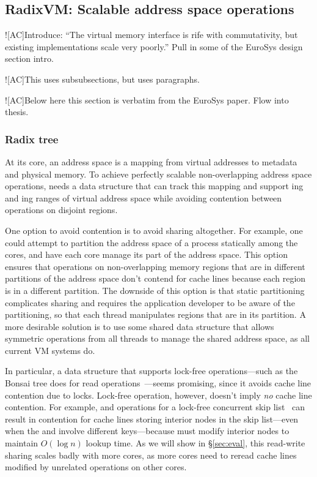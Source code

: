 \subsection{RadixVM: Scalable address space operations}

\XXX![AC]{Introduce: ``The virtual memory interface is rife with
  commutativity, but existing implementations scale very poorly.''
  Pull in some of the EuroSys design section intro.}

\XXX![AC]{This uses subsubsections, but  uses paragraphs.}

\XXX![AC]{Below here this section is verbatim from the EuroSys paper.
  Flow into thesis.}

\subsubsection{Radix tree}
\label{sec:radixvm:tree}

At its core, an address space is a mapping from virtual addresses to
metadata and physical memory.  To achieve perfectly scalable
non-overlapping address space operations, \vm needs a data structure
that can track this mapping and support ing and
ing ranges of virtual address space while avoiding
contention between operations on disjoint regions.

One option to avoid contention is to avoid sharing altogether. For
example, one could attempt to partition the address space of a process
statically
among the cores, and have each core manage its part of the address space.
This option ensures that operations on non-overlapping memory regions
that are in different partitions of the address space don't contend
for cache lines because each region is in a different partition. The
downside of this option is that static partitioning complicates
sharing and requires the application developer to
be aware of the partitioning, so that each thread manipulates
regions that are in its partition.  A more desirable solution is
to use some shared data structure that allows symmetric operations
from all threads to manage the shared address space,
as all current VM systems do.

In particular, a data structure that supports lock-free operations---such
as the Bonsai tree does for read
operations~\cite{clements:bonsai}---seems promising, since it avoids
cache line contention due to locks.  Lock-free operation,
however, doesn't imply \emph{no} cache line contention.  For example,
 and  operations for a lock-free concurrent skip
list~\cite{herlihy:art} can result in contention for cache lines
storing interior nodes in the skip list---even when the 
and  involve different keys---because  must
modify interior nodes to maintain $O(\log n)$ lookup time.  As we will show
in \S\ref{sec:eval}, this read-write sharing scales badly with more cores,
as more cores need to reread cache lines modified by unrelated
operations on other cores.

